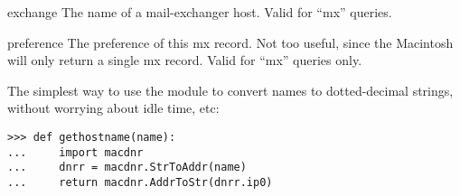 \begin{memberdesc}{exchange}
The name of a mail-exchanger host.  Valid for ``mx'' queries.
\end{memberdesc}

\begin{memberdesc}{preference}
The preference of this mx record.  Not too useful, since the Macintosh
will only return a single mx record.  Valid for ``mx'' queries only.
\end{memberdesc}

The simplest way to use the module to convert names to dotted-decimal
strings, without worrying about idle time, etc:
\begin{verbatim}
>>> def gethostname(name):
...     import macdnr
...     dnrr = macdnr.StrToAddr(name)
...     return macdnr.AddrToStr(dnrr.ip0)
\end{verbatim}
